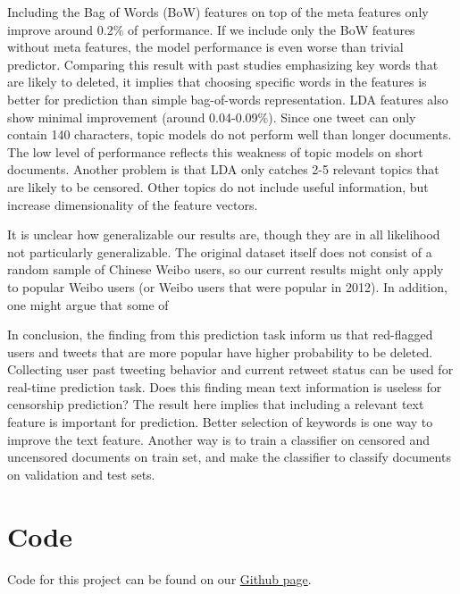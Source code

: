 \documentclass{sig-alternate-05-2015}
\begin{document}
Including the Bag of Words (BoW) features on top of the meta features only improve around 0.2\% of performance. If we include only the BoW features without meta features, the model performance is even worse than trivial predictor. Comparing this result with past studies emphasizing key words that are likely to deleted, it implies that choosing specific words in the features is better for prediction than simple bag-of-words representation. LDA features also show minimal improvement (around 0.04-0.09\%). Since one tweet can only contain 140 characters, topic models do not perform well than longer documents. The low level of performance reflects this weakness of topic models on short documents. Another problem is that LDA only catches 2-5 relevant topics that are likely to be censored. Other topics do not include useful information, but increase dimensionality of the feature vectors. 


It is unclear how generalizable our results are, though they are in all likelihood not particularly generalizable. The original dataset itself does not consist of a random sample of Chinese Weibo users, so our current results might only apply to popular Weibo users (or Weibo users that were popular in 2012). In addition, one might argue that some of 

In conclusion, the finding from this prediction task inform us that red-flagged users and tweets that are more popular have higher probability to be deleted. Collecting user past tweeting behavior and current retweet status can be used for real-time prediction task.  Does this finding mean text information is useless for censorship prediction? The result here implies that including a relevant text feature is important for prediction. Better selection of keywords is one way to improve the text feature. Another way is to train a classifier on censored and uncensored documents on train set, and make the classifier to classify documents on validation and test sets. 





\appendix
\section{Code}
Code for this project can be found on our \href{https://github.com/brtsay/CSE190_Assignment2}{Github page}.
\end{document}
